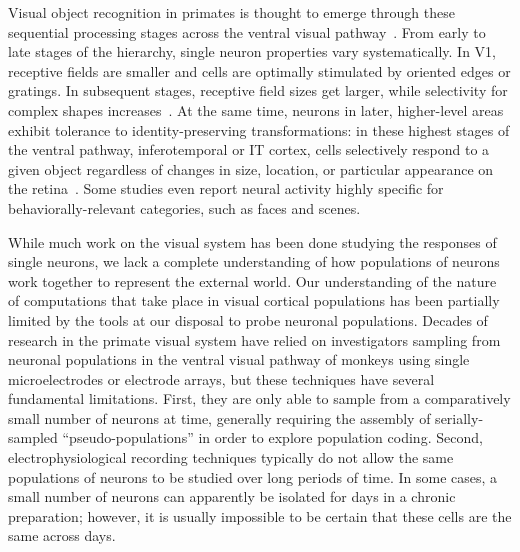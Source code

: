 Visual object recognition in primates is thought to emerge through these sequential processing stages across the ventral visual pathway~\cite{Rust2010SelectivityIT, DiCarlo2007, DiCarlo2012}. From early to late stages of the hierarchy, single neuron properties vary systematically. In V1, receptive fields are smaller and cells are optimally stimulated by oriented edges or gratings\cite{Hubel1968}. In subsequent stages, receptive field sizes get larger, while selectivity for complex shapes increases~\cite{Desimone1984, Logothetis1996}. At the same time, neurons in later, higher-level areas exhibit tolerance to identity-preserving transformations: in these highest stages of the ventral pathway, inferotemporal or IT cortex, cells selectively respond to a given object regardless of changes in size, location, or particular appearance on the retina~\cite{Tanaka1996, DiCarlo2012}. Some studies even report neural activity highly specific for behaviorally-relevant categories, such as faces\cite{Kanwisher1997, Tsao2006} and scenes\cite{Epstein1998}.

While much work on the visual system has been done studying the responses of single neurons, we lack a complete understanding of how populations of neurons work together to represent the external world. Our understanding of the nature of computations that take place in visual cortical populations has been partially limited by the tools at our disposal to probe neuronal populations. Decades of research in the primate visual system have relied on investigators sampling from neuronal populations in the ventral visual pathway of monkeys using single microelectrodes or electrode arrays, but these techniques have several fundamental limitations. First, they are only able to sample from a comparatively small number of neurons at time, generally requiring the assembly of serially-sampled ``pseudo-populations'' in order to explore population coding. Second, electrophysiological recording techniques typically do not allow the same populations of neurons to be studied over long periods of time. In some cases, a small number of neurons can apparently be isolated for days in a chronic preparation; however, it is usually impossible to be certain that these cells are the same across days. 

